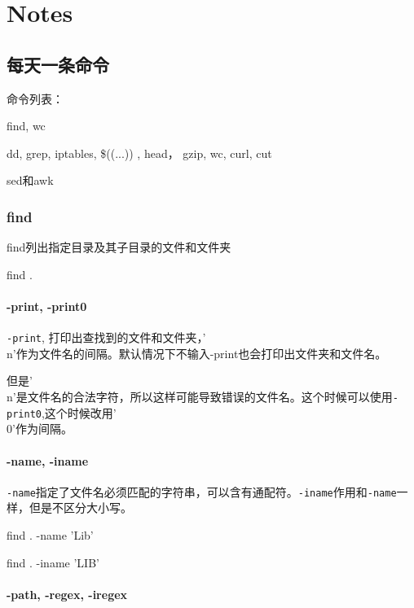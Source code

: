 \chapter{Notes}

\section{每天一条命令}
命令列表：


find, wc

dd, grep, iptables, \$((...)) , head， gzip, wc, curl, cut

sed和awk


\subsection{find}

find列出指定目录及其子目录的文件和文件夹

\begin{Bash}[查找当前目录及子目录的文件和文件夹]
find .
\end{Bash}


\subsubsection{-print, -print0}
\lstinline$-print$, 打印出查找到的文件和文件夹，'\\n'作为文件名的间隔。默认情况下不输入-print也会打印出文件夹和文件名。

但是'\\n'是文件名的合法字符，所以这样可能导致错误的文件名。这个时候可以使用\lstinline$-print0$,这个时候改用'\\0'作为间隔。

\subsubsection{-name, -iname}

\lstinline$-name$指定了文件名必须匹配的字符串，可以含有通配符。\lstinline$-iname$作用和\lstinline$-name$一样，但是不区分大小写。

\begin{Bash}[名字匹配指定的字符串]

find . -name 'Lib'

find . -iname 'LIB'

\end{Bash}


\subsubsection{ -path, -regex, -iregex}


